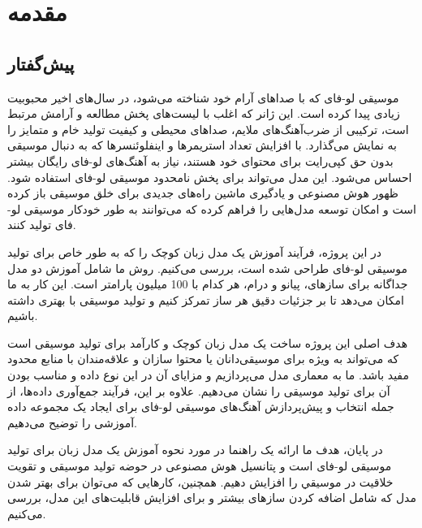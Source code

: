 \chapter{مقدمه}
\section{پیش‌گفتار}
موسیقی لو-فای که با صداهای آرام خود شناخته می‌شود، در سال‌های اخیر محبوبیت زیادی پیدا کرده است. این ژانر که اغلب با لیست‌های پخش مطالعه و آرامش مرتبط است، ترکیبی از ضرب‌آهنگ‌های ملایم، صداهای محیطی و کیفیت تولید خام و متمایز را به نمایش می‌گذارد. با افزایش تعداد استریمرها و اینفلوئنسرها که به دنبال موسیقی بدون حق کپی‌رایت برای محتوای خود هستند، نیاز به آهنگ‌های لو-فای رایگان بیشتر احساس می‌شود. این مدل می‌تواند برای پخش نامحدود موسیقی لو-فای استفاده شود. ظهور هوش مصنوعی  و یادگیری ماشین  راه‌های جدیدی برای خلق موسیقی باز کرده است و امکان توسعه مدل‌هایی را فراهم کرده که می‌توانند به طور خودکار موسیقی لو-فای تولید کنند.

در این پروژه، فرآیند آموزش یک مدل زبان کوچک را که به طور خاص برای تولید موسیقی لو-فای طراحی شده است، بررسی می‌کنیم. روش ما شامل آموزش دو مدل جداگانه برای سازهای، پیانو و درام، هر کدام با 100 میلیون پارامتر است. این کار به ما امکان می‌دهد تا بر جزئیات دقیق هر ساز تمرکز کنیم و تولید موسیقی با بهتری داشته باشیم.

هدف اصلی این پروژه ساخت یک مدل زبان کوچک و کارآمد برای تولید موسیقی است که می‌تواند به ویژه برای موسیقی‌دانان یا محتوا سازان  و علاقه‌مندان با منابع محدود مفید باشد. ما به معماری مدل  می‌پردازیم و مزایای آن در این نوع داده و مناسب بودن آن برای تولید موسیقی را نشان می‌دهیم. علاوه بر این، فرآیند جمع‌آوری داده‌ها، از جمله انتخاب و پیش‌پردازش آهنگ‌های موسیقی لو-فای برای ایجاد یک مجموعه داده آموزشی را توضیح می‌دهیم.

در پایان، هدف ما ارائه یک راهنما در مورد نحوه آموزش یک مدل زبان برای تولید موسیقی لو-فای است و پتانسیل هوش مصنوعی در حوضه تولید موسیقی و تقویت خلاقیت در موسیقي را افزایش دهیم. همچنین، کارهایی که می‌توان برای بهتر شدن مدل که شامل اضافه کردن سازهای بیشتر و  برای افزایش قابلیت‌های این مدل، بررسی می‌کنیم.